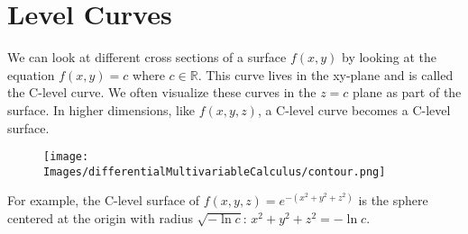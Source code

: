 \section{Level Curves}
\noindent
We can look at different cross sections of a surface $f(x,y)$ by looking at the equation $f(x,y) = c$ where $c \in \mathbb{R}$.
This curve lives in the xy-plane and is called the C-level curve.
We often visualize these curves in the $z=c$ plane as part of the surface.
In higher dimensions, like $f(x,y,z)$, a C-level curve becomes a C-level surface.

\begin{figure}[H]
	\centering
	\texttt{[image: Images/differentialMultivariableCalculus/contour.png]}
\end{figure}
\noindent
For example, the C-level surface of $f(x,y,z) = e^{-\left(x^2+y^2+z^2\right)}$ is the sphere centered at the origin with radius $\sqrt{-\ln{c}}$: $x^2 + y^2 + z^ 2 =-\ln{c}$.